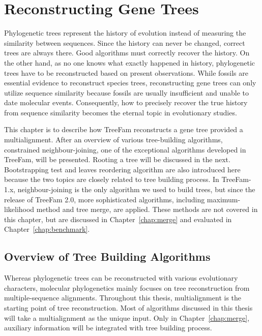 \chapter{Reconstructing Gene Trees} \label{chap:buildtree}

Phylogenetic trees represent the history of evolution instead of measuring the similarity
between sequences. Since the history can never be changed, correct trees are always there.
Good algorithms must correctly recover the history.
On the other hand, as no one knows what exactly happened in history, phylogenetic trees
have to be reconstructed based on present observations. While fossils are essential
evidence to reconstruct species trees, reconstructing gene trees can only utilize
sequence similarity because fossils are usually insufficient and unable to date
molecular events. Consequently, how to precisely recover the true history from sequence similarity
becomes the eternal topic in evolutionary studies.

This chapter is to describe how TreeFam reconstructs a gene tree provided a multialignment.
After an overview of various tree-building algorithms, constrained neighbour-joining,
one of the exceptional algorithms developed in TreeFam, will be presented.
Rooting a tree will be discussed in the next.
Bootstrapping test and leaves reordering algorithm are also introduced here because the two
topics are closely related to tree building process. In TreeFam-1.x, neighbour-joining is
the only algorithm we used to build trees, but since the release of TreeFam 2.0,
more sophisticated algorithms, including maximum-likelihood method and tree merge, are applied.
These methods are not covered in this chapter, but are discussed in Chapter~\ref{chap:merge} and evaluated
in Chapter~\ref{chap:benchmark}.

\section{Overview of Tree Building Algorithms}

Whereas phylogenetic trees can be reconstructed with various evolutionary characters,
molecular phylogenetics mainly focuses on tree reconstruction from multiple-sequence
alignments. Throughout this thesis, multialignment is the starting point of tree reconstruction.
Most of algorithms discussed in this thesis will take a multialignment as the unique input.
Only in Chapter~\ref{chap:merge}, auxiliary information will be integrated with tree building process.

